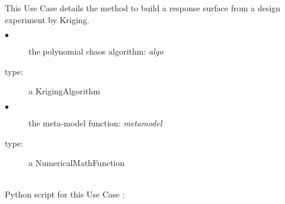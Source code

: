 \renewcommand{\filename}{docUC_RespSurface_Kriging.tex}
\renewcommand{\filetitle}{UC : Kriging metamodelling approximation from a design experiment}

\HeaderIIILevel

\label{krigingApprox}


This Use Case details the method to build a response surface from a design experiment by Kriging.




             {
               \begin{description}
               \item[$\bullet$] the polynomial chaos algorithm: {\itshape algo}
               \item[type:] a KrigingAlgorithm
               \item[$\bullet$] the meta-model function: {\itshape metamodel}
               \item[type:] a NumericalMathFunction
               \end{description}
             }

             \textspace\\
             Python script for this Use Case :

